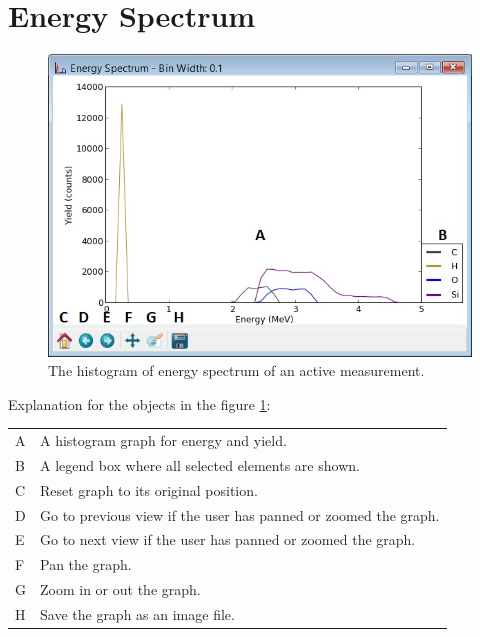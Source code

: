 \documentclass{scrreprt}
\begin{document}
\section{Energy Spectrum}\label{measurementtab-energy}
\begin{figure}[H]
\centering
\includegraphics[width=140mm]{measurement-energy}
\caption{The histogram of energy spectrum of an active measurement.}
\label{fig-energy}
\end{figure}
Explanation for the objects in the figure \ref{fig-energy}:

\begin{tabular}{ll}
A & A histogram graph for energy and yield.\\
B & A legend box where all selected elements are shown.\\
C & Reset graph to its original position.\\
D & Go to previous view if the user has panned or zoomed the graph.\\
E & Go to next view if the user has panned or zoomed the graph.\\
F & Pan the graph.\\
G & Zoom in or out the graph.\\
H & Save the graph as an image file.\\
\end{tabular}

\end{document}
